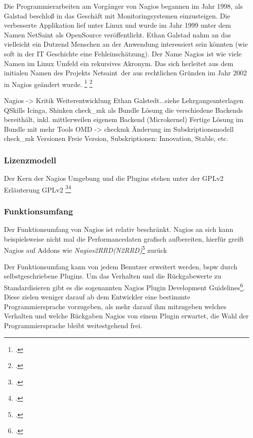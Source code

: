 \documentclass[12pt,a4paper,parskip,listof=totoc,bibliography=totoc]{scrreprt}
\begin{document}
	Die Programmierarbeiten am Vorgänger von Nagios begannen im Jahr 1998, als Galstad beschloß in das Geschäft mit Monitoringsystemen einzusteigen. Die verbesserte Applikation lief unter Linux und wurde im Jahr 1999 unter dem Namen NetSaint als OpenSource veröffentlicht. Ethan Galstad nahm an das vielleicht ein Dutzend Menschen an der Anwendung interessiert sein könnten (wie soft in der IT Geschichte eine Fehleinschätzung).
	Der Name Nagios ist wie viele Namen im Linux Umfeld ein rekursives Akronym. Das sich herleitet aus dem initialen Namen des Projekts \glqq Netsaint\grqq\ der aus rechtlichen Gründen im Jahr 2002 in Nagios geändert wurde. 
	\footcite{nagioshistory} \footcite{nagiosnamefaq}
	
	Nagios -> Kritik Weiterentwicklung Ethan Galstedt...siehe Lehrgangsunterlagen QSkills
	Icinga, Shinken
	check\_mk als Bundle Lösung die verschiedene Backends bereithält, inkl. mittlerweilen eigenem Backend (Microkernel)
	Fertige Lösung im Bundle mit mehr Tools
	OMD -> checkmk Änderung im Subskriptionsmodell
	check\_mk Versionen Freie Version, Subskriptionen: Innovation, Stable, etc.
	
	\subsubsection{Lizenzmodell}
	Der Kern der Nagios Umgebung und die Plugins stehen unter der GPLv2
	Erläuterung GPLv2 \footcite{gplv2de}\footcite{gplv2en}
	\subsubsection{Funktionsumfang}
	Der Funktionsumfang von Nagios ist relativ beschränkt. Nagios an sich kann beispielsweise nicht mal die Performancedaten grafisch aufbereiten, hierfür greift
	Nagios auf Addons wie \textit{Nagios2RRD(N2RRD)}\footcite{n2rrdprojecthome} zurück
	
	
	Der Funktionsumfang kann von jedem Benutzer erweitert werden, \acrlong{bspw} durch selbstgeschriebene Plugins. Um das Verhalten und die Rückgabewerte zu Standardisieren gibt es die sogenannten \glqq Nagios Plugin Development Guidelines\grqq\footcite{nagiospluginguidelines}. Diese zielen weniger darauf ab dem Entwickler eine bestimmte Programmiersprache vorzugeben, als mehr darauf ihm mitzugeben welches Verhalten und welche Rückgaben Nagios von einem Plugin erwartet, die Wahl der Programmiersprache bleibt weitestgehend frei.
	
\end{document}
